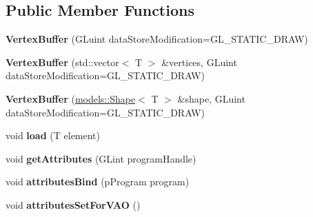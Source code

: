 \subsection*{Public Member Functions}
\begin{DoxyCompactItemize}
\item 
\hypertarget{classfillwave_1_1core_1_1VertexBuffer_a9a1f7bc8cf026c7928a4d5b949200e6a}{}{\bfseries Vertex\+Buffer} (G\+Luint data\+Store\+Modification=G\+L\+\_\+\+S\+T\+A\+T\+I\+C\+\_\+\+D\+R\+A\+W)\label{classfillwave_1_1core_1_1VertexBuffer_a9a1f7bc8cf026c7928a4d5b949200e6a}

\item 
\hypertarget{classfillwave_1_1core_1_1VertexBuffer_a6e538573079453bc6304a7a10b898d6a}{}{\bfseries Vertex\+Buffer} (std\+::vector$<$ T $>$ \&vertices, G\+Luint data\+Store\+Modification=G\+L\+\_\+\+S\+T\+A\+T\+I\+C\+\_\+\+D\+R\+A\+W)\label{classfillwave_1_1core_1_1VertexBuffer_a6e538573079453bc6304a7a10b898d6a}

\item 
\hypertarget{classfillwave_1_1core_1_1VertexBuffer_aec64513416eab4ebaf03abc90a0f4416}{}{\bfseries Vertex\+Buffer} (\hyperlink{classfillwave_1_1models_1_1Shape}{models\+::\+Shape}$<$ T $>$ \&shape, G\+Luint data\+Store\+Modification=G\+L\+\_\+\+S\+T\+A\+T\+I\+C\+\_\+\+D\+R\+A\+W)\label{classfillwave_1_1core_1_1VertexBuffer_aec64513416eab4ebaf03abc90a0f4416}

\item 
\hypertarget{classfillwave_1_1core_1_1VertexBuffer_ab24be4f6c2812684bf95a4f8de882f19}{}void {\bfseries load} (T element)\label{classfillwave_1_1core_1_1VertexBuffer_ab24be4f6c2812684bf95a4f8de882f19}

\item 
\hypertarget{classfillwave_1_1core_1_1VertexBuffer_a11e9edc6b2bcacc1b38432466345c841}{}void {\bfseries get\+Attributes} (G\+Lint program\+Handle)\label{classfillwave_1_1core_1_1VertexBuffer_a11e9edc6b2bcacc1b38432466345c841}

\item 
\hypertarget{classfillwave_1_1core_1_1VertexBuffer_a8b4b764dcb7ace30d87a8a6cc8713c17}{}void {\bfseries attributes\+Bind} (p\+Program program)\label{classfillwave_1_1core_1_1VertexBuffer_a8b4b764dcb7ace30d87a8a6cc8713c17}

\item 
\hypertarget{classfillwave_1_1core_1_1VertexBuffer_a66bf88aeada9711763730d3a4d96fcbf}{}void {\bfseries attributes\+Set\+For\+V\+A\+O} ()\label{classfillwave_1_1core_1_1VertexBuffer_a66bf88aeada9711763730d3a4d96fcbf}


\end{DoxyCompactItemize}

